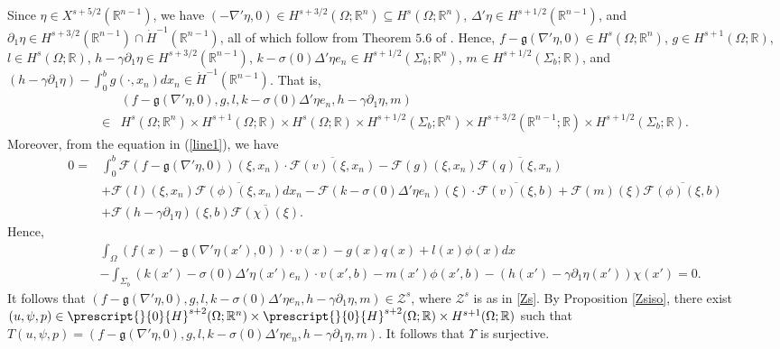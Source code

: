 \documentclass[11pt,letterpaper,reqno]{amsart}
\numberwithin{equation}{section}
\begin{document}
Since \(\eta \in X^{s+5/2}(\mathbb{R}^{n-1})\), we have \((-\nabla'\eta,0) \in H^{s+3/2}(\Omega;\mathbb{R}^{n}) \subseteq H^{s}(\Omega;\mathbb{R}^{n})\), \(\Delta'\eta \in H^{s+1/2}(\mathbb{R}^{n-1})\), and \(\partial_{1}\eta \in H^{s+3/2}(\mathbb{R}^{n-1}) \cap \dot{H}^{-1}(\mathbb{R}^{n-1})\), all of which follow from Theorem \(5.6\) of \cite{leoni2023traveling}. Hence, \(f-\mathfrak{g}(\nabla'\eta,0)\in H^{s}(\Omega;\mathbb{R}^{n})\), \(g \in H^{s+1}(\Omega;\mathbb{R})\), \(l \in H^{s}(\Omega;\mathbb{R})\), \(h-\gamma\partial_{1}\eta \in H^{s+3/2}(\mathbb{R}^{n-1})\), \(k-\sigma(0)\Delta'\eta e_{n} \in H^{s+1/2}(\Sigma_{b};\mathbb{R}^{n})\), \(m \in H^{s+1/2}(\Sigma_{b};\mathbb{R})\), and \((h-\gamma\partial_{1}\eta)-\int_{0}^{b}g(\cdot,x_{n})dx_{n}\in \dot{H}^{-1}(\mathbb{R}^{n-1})\). That is,
\begin{align}
    &(f-\mathfrak{g}(\nabla'\eta,0),g,l,k-\sigma(0)\Delta'\eta e_{n},h-\gamma\partial_{1}\eta,m) \nonumber \\
    \in&H^{s}(\Omega;\mathbb{R}^{n}) \times H^{s+1}(\Omega;\mathbb{R}) \times H^{s}(\Omega;\mathbb{R}) \times H^{s+1/2}(\Sigma_{b};\mathbb{R}^{n}) \times H^{s+3/2}(\mathbb{R}^{n-1};\mathbb{R}) \times H^{s+1/2}(\Sigma_{b};\mathbb{R}).
\end{align}
Moreover, from the equation in (\ref{line1}), we have
\begin{align}
    0=&\int_{0}^{b}\mathcal{F}(f-\mathfrak{g}(\nabla'\eta,0))(\xi,x_{n})\cdot \overline{\mathcal{F}(v)(\xi,x_{n})}-\mathcal{F}(g)(\xi,x_{n})\overline{\mathcal{F}(q)(\xi,x_{n})} \nonumber\\
    &+\mathcal{F}(l)(\xi,x_{n})\overline{\mathcal{F}(\phi)(\xi,x_{n})}dx_{n} -\mathcal{F}(k-\sigma(0)\Delta'\eta e_{n})(\xi)\cdot\overline{\mathcal{F}(v)(\xi,b)}+\mathcal{F}(m)(\xi)\overline{\mathcal{F}(\phi)(\xi,b)} \nonumber\\
    &+\mathcal{F}(h-\gamma\partial_{1}\eta)(\xi,b)\overline{\mathcal{F}(\chi)(\xi)}.
\end{align}
Hence,
\begin{align}
    &\int_{\Omega}(f(x)-\mathfrak{g}(\nabla'\eta(x'),0))\cdot v(x)-g(x)q(x)+l(x)\phi(x)dx \nonumber\\
    &-\int_{\Sigma_{b}}(k(x')-\sigma(0)\Delta'\eta(x')e_{n})\cdot v(x',b)-m(x')\phi(x',b)-(h(x')-\gamma\partial_{1}\eta(x'))\chi(x')=0.
\end{align}
It follows that \((f-\mathfrak{g}(\nabla'\eta,0),g,l,k-\sigma(0)\Delta'\eta e_{n},h-\gamma\partial_{1}\eta,m) \in\mathcal{Z}^{s}\), where \(\mathcal{Z}^{s}\) is as in \eqref{Zs}. By Proposition \ref{Zsiso}, there exist \((u,\psi,p) \in \prescript{}{0}{H}^{s+2}(\Omega;\mathbb{R}^{n}) \times \prescript{}{0}{H}^{s+2}(\Omega;\mathbb{R})\times H^{s+1}(\Omega;\mathbb{R})\) such that \(T(u,\psi,p)=(f-\mathfrak{g}(\nabla'\eta,0),g,l,k-\sigma(0)\Delta'\eta e_{n},h-\gamma\partial_{1}\eta,m)\). It follows that \(\Upsilon\) is surjective.
\end{document}
